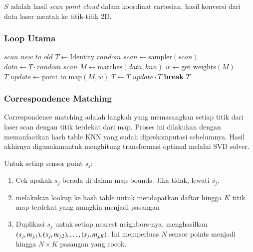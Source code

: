 $S$ adalah hasil \emph{scan point cloud} dalam koordinat cartesian, hasil konversi dari data laser mentah ke titik-titik 2D.

\subsubsection{Loop Utama}

\begin{algorithm}[H]
\caption{ICP Single Iteration}
\begin{algorithmic}[1]
\Require $scan$ 
\Ensure $new\_to\_old$ 
\State $T \gets \text{Identity}$
    \State $random\_scan \gets \text{sampler}(scan)$ 
    \State $data \gets T \cdot random\_scan$ 
    \State $M \gets \text{matches}(data, knn)$ 
    \State $w \gets \text{get\_weights}(M)$ 
    \State $T\_update \gets \text{point\_to\_map}(M, w)$ 
    \State $T \gets T\_update \cdot T$ 
        \State \textbf{break}
    \EndIf
\EndFor
\State \Return $T$
\end{algorithmic}
\end{algorithm}


\subsubsection{Correspondence Matching}

Correspondence matching adalah langkah yang memasangkan setiap titik dari laser scan dengan titik terdekat dari map. Proses ini dilakukan dengan memanfaatkan hash table KNN yang sudah diprekomputasi sebelumnya. Hasil akhirnya digunakanuntuk menghitung transformasi optimal melalui SVD solver.

Untuk setiap sensor point $s_j$:

\begin{enumerate}
  \item Cek apakah $s_j$ berada di dalam map bounds. Jika tidak, lewati $s_j$.
  \item melakukan lookup ke hash table untuk mendapatkan daftar hingga $K$ titik map terdekat yang mungkin menjadi pasangan
  \item Duplikasi $s_j$ untuk setiap nearest neighbors-nya, menghasilkan $(s_j, m_{j,1}), (s_j, m_{j,2}), \dots,\\ (s_j, m_{j,K})$. Ini memperluas $N$ sensor points menjadi hingga $N \times K$ pasangan yang cocok.
\end{enumerate}

